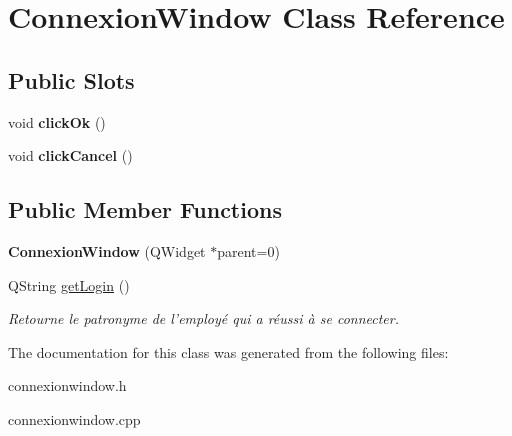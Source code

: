 \hypertarget{class_connexion_window}{\section{Connexion\-Window Class Reference}
\label{class_connexion_window}
}
\subsection*{Public Slots}
\begin{DoxyCompactItemize}
\item 
\hypertarget{class_connexion_window_a34c4b59c4a94be4e9901f26ee99c615f}{void {\bfseries click\-Ok} ()}\label{class_connexion_window_a34c4b59c4a94be4e9901f26ee99c615f}

\item 
\hypertarget{class_connexion_window_a6b554c261bc4a4464d4384bb81e66b83}{void {\bfseries click\-Cancel} ()}\label{class_connexion_window_a6b554c261bc4a4464d4384bb81e66b83}

\end{DoxyCompactItemize}
\subsection*{Public Member Functions}
\begin{DoxyCompactItemize}
\item 
\hypertarget{class_connexion_window_ace941159eee0b182d18ee14112f1bfdc}{{\bfseries Connexion\-Window} (Q\-Widget $\ast$parent=0)}\label{class_connexion_window_ace941159eee0b182d18ee14112f1bfdc}

\item 
\hypertarget{class_connexion_window_a91487b1f3d79623f94d2df296e361d25}{Q\-String \hyperlink{class_connexion_window_a91487b1f3d79623f94d2df296e361d25}{get\-Login} ()}\label{class_connexion_window_a91487b1f3d79623f94d2df296e361d25}

\begin{DoxyCompactList}\small\item\em Retourne le patronyme de l'employé qui a réussi à se connecter. \end{DoxyCompactList}\end{DoxyCompactItemize}


The documentation for this class was generated from the following files\-:\begin{DoxyCompactItemize}
\item 
connexionwindow.\-h\item 
connexionwindow.\-cpp\end{DoxyCompactItemize}
